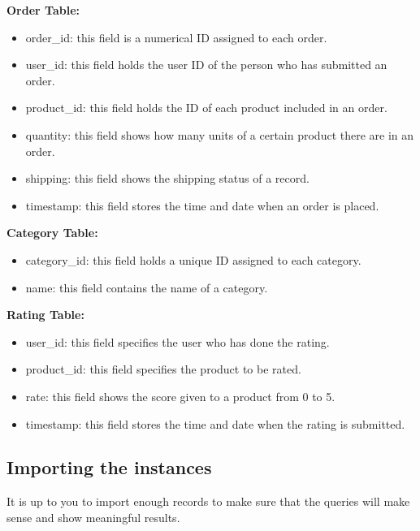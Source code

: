 \documentclass{homework}
\begin{document}
\textbf{Order Table:}
\begin{itemize}
    \item order\_id: this field is a numerical ID assigned to each order.
    \item user\_id: this field holds the user ID of the person who has submitted an order.
    \item product\_id: this field holds the ID of each product included in an order.
    \item quantity: this field shows how many units of a certain product there are in an order.
    \item shipping: this field shows the shipping status of a record.
    \item timestamp: this field stores the time and date when an order is placed.
\end{itemize}

\textbf{Category Table:}
\begin{itemize}
    \item category\_id: this field holds a unique ID assigned to each category.
    \item name: this field contains the name of a category.
\end{itemize}

\textbf{Rating Table:}
\begin{itemize}
    \item user\_id: this field specifies the user who has done the rating.
    \item product\_id: this field specifies the product to be rated.
    \item rate: this field shows the score given to a product from 0 to 5.
    \item timestamp: this field stores the time and date when the rating is submitted.
\end{itemize}

\subsection*{Importing the instances}
It is up to you to import enough records to make sure that the queries will make sense and show meaningful results.
\end{document}
